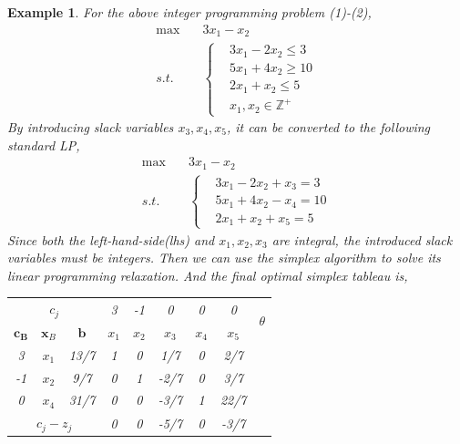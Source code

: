 \documentclass{article}
\newtheorem{example}{Example}
\begin{document}
 \newpage
 \begin{example}
 	For the above integer programming problem (1)-(2), 
 	\begin{align*}
 	\max \quad & 3x_1 - x_2 \\
 	s.t. \quad & \left\{
 	\begin{aligned}
 	& 3x_1 - 2x_2 \leq 3 \\
 	& 5x_1 + 4x_2 \geq 10 \\
 	& 2x_1 + x_2 \leq 5 \\
 	& x_1, x_2 \in \mathbb{Z}^+
 	\end{aligned}\right.
 	\end{align*}
 	By introducing slack variables $x_3, x_4, x_5$, it can be converted to the following standard LP,
 	\begin{align*}
 		\max \quad & 3x_1 - x_2 \\
 		s.t. \quad & \left\{
 		\begin{aligned}
 		& 3x_1 - 2x_2 + x_3 = 3 \\
 		& 5x_1 + 4x_2 - x_4 = 10 \\
 		& 2x_1 + x_2 + x_5 = 5
 		\end{aligned}
 		\right.
 	\end{align*} 
 	Since both the left-hand-side(lhs) and $x_1, x_2, x_3$ are integral, the introduced slack variables must be integers. Then we can use the simplex algorithm to solve its linear programming relaxation. And the final optimal simplex tableau is,
 		\begin{table}[htbp]
	 		\centering
	 		\begin{tabular}{@{}ccccccccc@{}}
	 			\toprule
	 			\multicolumn{3}{c}{$c_j$}      & 3       & -1    & 0    & 0    & 0     & \multirow{2}{*}{$\theta$} \\ \cmidrule(r){1-8}
	 			$\bm{c_B}$     & $\bm{x}_B$     & $\bm{b}$       & $x_1$    & $x_2$ & $x_3$ & $x_4$ & $x_5$  &                        \\ \midrule
	 			3        & $x_1$     & 13/7      & 1       & 0    & 1/7    & 0    & 2/7     &                       \\
	 			-1        & $x_2$     & 9/7      & 0        & 1    & -2/7    & 0    & 3/7     &                       \\
	 			0        & $x_4$     & 31/7       & 0       & 0    & -3/7    & 1    & 22/7     &                       \\ \midrule
	 			\multicolumn{3}{c}{$c_j-z_j$} & 0       & 0    & -5/7    & 0    & -3/7     &                        \\  \bottomrule
	 		\end{tabular}%
 		\end{table}
 

\end{example}
\end{document}
